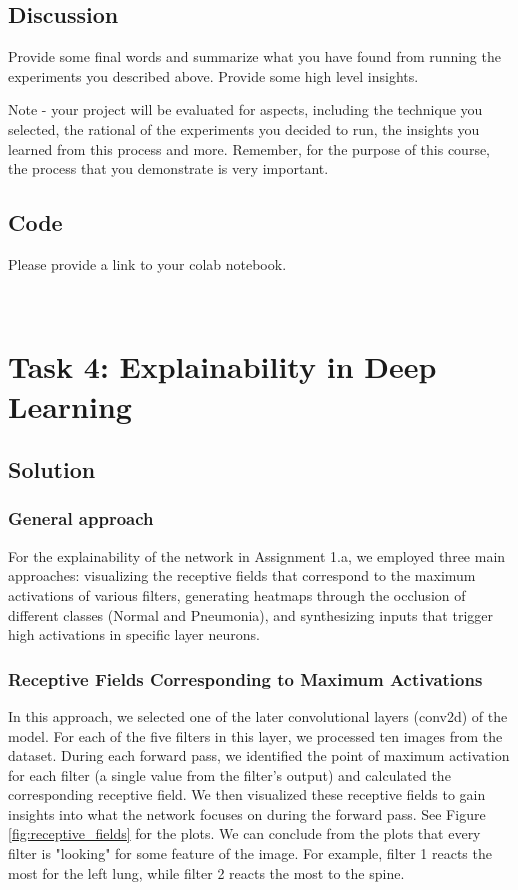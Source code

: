 \documentclass{article}
\begin{document}
\subsection{Discussion}
Provide some final words and summarize what you have found from running the experiments you described above. Provide some high level insights.

Note - your project will be evaluated for aspects, including the technique you selected, the rational of the experiments you decided to run, the insights you learned from this process and more. Remember, for the purpose of this course, the process that you demonstrate is very  important.

\subsection{Code}

Please provide a link to your colab notebook.


\
\section{Task 4: Explainability in Deep Learning}

\subsection{Solution}
\subsubsection{General approach}
For the explainability of the network in Assignment 1.a, we employed three main approaches: visualizing the receptive fields that correspond to the maximum activations of various filters, generating heatmaps through the occlusion of different classes (Normal and Pneumonia), and synthesizing inputs that trigger high activations in specific layer neurons.

\subsubsection{Receptive Fields Corresponding to Maximum Activations}
In this approach, we selected one of the later convolutional layers (conv2d) of the model. For each of the five filters in this layer, we processed ten images from the dataset. During each forward pass, we identified the point of maximum activation for each filter (a single value from the filter's output) and calculated the corresponding receptive field. We then visualized these receptive fields to gain insights into what the network focuses on during the forward pass. See Figure \ref{fig:receptive_fields} for the plots. We can conclude from the plots that every filter is "looking" for some feature of the image. For example, filter 1 reacts the most for the left lung, while filter 2 reacts the most to the spine.
\end{document}
